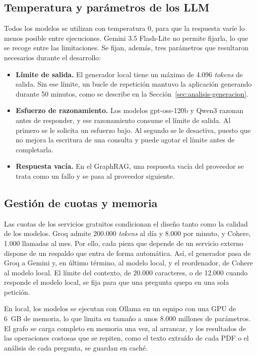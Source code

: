 \documentclass[11pt, a4paper]{report}
\begin{document}
	\subsection{Temperatura y parámetros de los LLM}

	Todos los modelos se utilizan con temperatura 0, para que la respuesta varíe
	lo menos posible entre ejecuciones. Gemini 3.5 Flash-Lite no permite fijarla,
	lo que se recoge entre las limitaciones. Se fijan, además, tres parámetros que
	resultaron necesarios durante el desarrollo:

	\begin{itemize}
		\item \textbf{Límite de salida.} El generador local tiene un máximo de
		4.096 \textit{tokens} de salida. Sin ese límite, un bucle de repetición
		mantuvo la aplicación generando durante 50 minutos, como se describe en la
		Sección~\ref{sec:analisis-generacion}.
		\item \textbf{Esfuerzo de razonamiento.} Los modelos gpt-oss-120b y Qwen3
		razonan antes de responder, y ese razonamiento consume el límite de
		salida. Al primero se le solicita un esfuerzo bajo. Al segundo se le desactiva, puesto que no mejora la escritura de una consulta y puede agotar el
		límite antes de completarla.
		\item \textbf{Respuesta vacía.} En el GraphRAG, una respuesta vacía del
		proveedor se trata como un fallo y se pasa al proveedor siguiente.
	\end{itemize}

	\subsection{Gestión de cuotas y memoria}

	Las cuotas de los servicios gratuitos condicionan el diseño tanto como la
	calidad de los modelos. Groq admite 200.000 \textit{tokens} al día y 8.000
	por minuto, y Cohere, 1.000 llamadas al mes. Por ello, cada pieza que depende
	de un servicio externo dispone de un respaldo que entra de forma automática. Así, el generador pasa de Groq a Gemini y, en último término, al modelo local, y el
	reordenador, de Cohere al modelo local. El límite del contexto, de 20.000
	caracteres, o de 12.000 cuando responde el modelo local, se fija para que una
	pregunta quepa en una sola petición.

	En local, los modelos se ejecutan con Ollama en un equipo con una GPU de 6~GB
	de memoria, lo que limita su tamaño a unos 8.000 millones de parámetros. El
	grafo se carga completo en memoria una vez, al arrancar, y los resultados de
	las operaciones costosas que se repiten, como el texto extraído de cada PDF o
	el análisis de cada pregunta, se guardan en caché.
\end{document}
